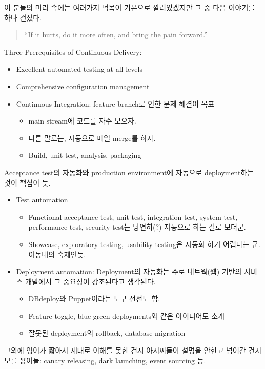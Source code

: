 \documentclass[a4paper]{article}
\begin{document}
이 분들의 머리 속에는 여러가지 덕목이 기본으로 깔려있겠지만 그 중 다음
이야기를 하나 건졌다.

\begin{quote}
``If it hurts, do it more often, and bring the pain forward.''  
\end{quote}
 
Three Prerequisites of Continuous Delivery:
\begin{itemize}
\item Excellent automated testing at all levels
\item Comprehensive configuration management
\item Continuous Integration: feature branch로 인한 문제 해결이 목표
  \begin{itemize}
  \item main stream에 코드를 자주 모으자.
  \item 다른 말로는, 자동으로 매일 merge를 하자.
  \item Build, unit test, analysis, packaging
  \end{itemize}
\end{itemize}

Acceptance test의 자동화와 production environment에 자동으로
deployment하는 것이 핵심이 듯.
 
\begin{itemize}
\item Test automation
  \begin{itemize}
  \item Functional acceptance test, unit test, integration test,
    system test, performance test, security test는 당연히(?) 자동으로
    하는 걸로 보더군.
  \item Showcase, exploratory testing, usability testing은 자동화 하기
    어렵다는 군. 이동네의 숙제인듯.
  \end{itemize}
\item Deployment automation: Deployment의 자동화는 주로 네트웍(웹)
  기반의 서비스 개발에서 그 중요성이 강조된다고 생각된다.
  \begin{itemize}
  \item DBdeploy와 Puppet이라는 도구 선전도 함.
  \item Feature toggle, blue-green deployments와 같은 아이디어도 소개
  \item 잘못된 deployment의 rollback, database migration
  \end{itemize}
\end{itemize}
 
그외에 영어가 짧아서 제대로 이해를 못한 건지 아저씨들이 설명을 안한고
넘어간 건지 모를 용어들: canary releasing, dark launching, event
sourcing 등.
 
\end{document}
